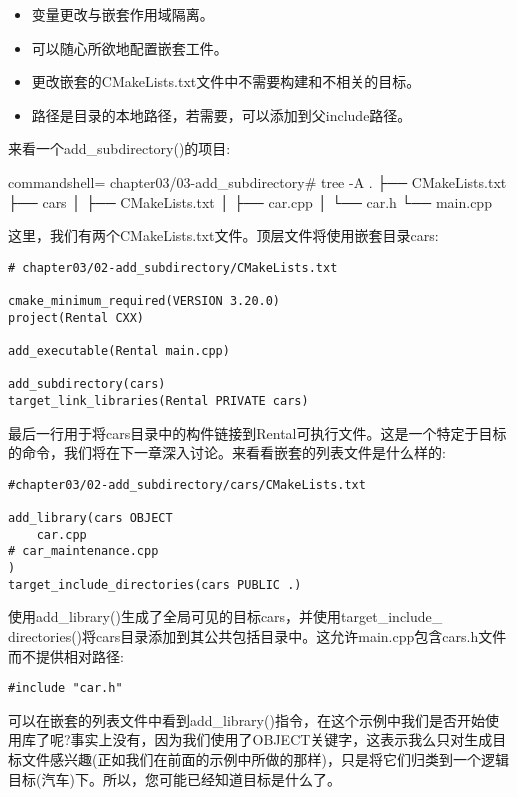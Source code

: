 \begin{itemize}
\item 
变量更改与嵌套作用域隔离。

\item 
可以随心所欲地配置嵌套工件。

\item 
更改嵌套的CMakeLists.txt文件中不需要构建和不相关的目标。

\item 
路径是目录的本地路径，若需要，可以添加到父include路径。
\end{itemize}

来看一个add\_subdirectory()的项目:

\begin{tcblisting}{commandshell={}}
chapter03/03-add_subdirectory# tree -A
.
├── CMakeLists.txt
├── cars
│     ├── CMakeLists.txt
│     ├── car.cpp
│     └── car.h
└── main.cpp
\end{tcblisting}

这里，我们有两个CMakeLists.txt文件。顶层文件将使用嵌套目录cars:

\begin{lstlisting}[style=styleCMake]
# chapter03/02-add_subdirectory/CMakeLists.txt

cmake_minimum_required(VERSION 3.20.0)
project(Rental CXX)

add_executable(Rental main.cpp)

add_subdirectory(cars)
target_link_libraries(Rental PRIVATE cars)
\end{lstlisting}

最后一行用于将cars目录中的构件链接到Rental可执行文件。这是一个特定于目标的命令，我们将在下一章深入讨论。来看看嵌套的列表文件是什么样的:

\begin{lstlisting}[style=styleCMake]
#chapter03/02-add_subdirectory/cars/CMakeLists.txt

add_library(cars OBJECT
	car.cpp
# car_maintenance.cpp
)
target_include_directories(cars PUBLIC .)
\end{lstlisting}

使用add\_library()生成了全局可见的目标cars，并使用target\_include\_ directories()将cars目录添加到其公共包括目录中。这允许main.cpp包含cars.h文件而不提供相对路径:

\begin{lstlisting}[style=styleCXX]
#include "car.h"
\end{lstlisting}

可以在嵌套的列表文件中看到add\_library()指令，在这个示例中我们是否开始使用库了呢?事实上没有，因为我们使用了OBJECT关键字，这表示我么只对生成目标文件感兴趣(正如我们在前面的示例中所做的那样)，只是将它们归类到一个逻辑目标(汽车)下。所以，您可能已经知道目标是什么了。

